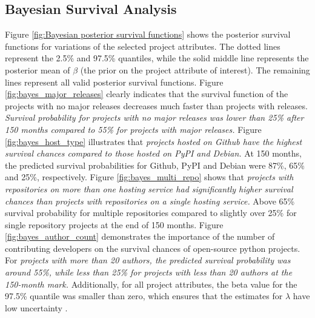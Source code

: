 \documentclass[sigconf,review]{acmart}
\begin{document}
\subsection{Bayesian Survival Analysis} \label{bayes-results}

Figure \ref{fig:Bayesian posterior survival functions} shows the posterior survival functions for variations of the selected project attributes. 
The dotted lines represent the  2.5\% and 97.5\% quantiles, while the solid middle line represents the posterior mean of $\beta$ (the prior on the project attribute of interest). 
The remaining lines represent all valid posterior survival functions. 
Figure \ref{fig:bayes_major_releases} clearly indicates that the survival function of the projects with no major releases decreases much faster than projects with releases. 
\emph{Survival probability for projects with no major releases was lower than 25\% after 150 months compared to 55\% for projects with major releases.}
Figure \ref{fig:bayes_host_type} illustrates that \emph{projects hosted on Github have the highest survival chances compared to those hosted on PyPI and Debian.} 
At 150 months, the predicted survival probabilities for Github, PyPI and Debian were 87\%, 65\% and 25\%, respectively.
Figure \ref{fig:bayes_multi_repo} shows that \emph{projects with repositories on more than one hosting service had significantly higher survival chances than projects with repositories on a single hosting service.}
Above 65\% survival probability for multiple repositories compared to slightly over 25\% for single repository projects at the end of 150 months.
Figure \ref{fig:bayes_author_count} demonstrates the importance of the number of contributing developers on the survival chances of open-source python projects. 
For \emph{projects with more than 20 authors, the predicted survival probability was around 55\%, while less than 25\% for projects with less than 20 authors at the 150-month mark.}
Additionally, for all project attributes, the beta value for the 97.5\% quantile was smaller than zero, which ensures that the estimates for $\lambda$ have low uncertainty \cite{kelter2020bayesian}.
\end{document}
